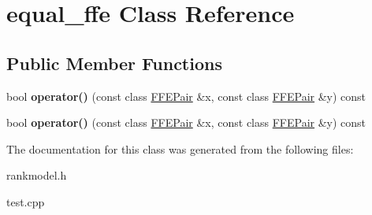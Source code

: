 \hypertarget{classequal__ffe}{\section{equal\-\_\-ffe \-Class \-Reference}
\label{classequal__ffe}
}
\subsection*{\-Public \-Member \-Functions}
\begin{DoxyCompactItemize}
\item 
\hypertarget{classequal__ffe_a6e55584c947cb40c2657bdb3da97ede2}{bool {\bfseries operator()} (const class \hyperlink{classFFEPair}{\-F\-F\-E\-Pair} \&x, const class \hyperlink{classFFEPair}{\-F\-F\-E\-Pair} \&y) const }\label{classequal__ffe_a6e55584c947cb40c2657bdb3da97ede2}

\item 
\hypertarget{classequal__ffe_a6e55584c947cb40c2657bdb3da97ede2}{bool {\bfseries operator()} (const class \hyperlink{classFFEPair}{\-F\-F\-E\-Pair} \&x, const class \hyperlink{classFFEPair}{\-F\-F\-E\-Pair} \&y) const }\label{classequal__ffe_a6e55584c947cb40c2657bdb3da97ede2}

\end{DoxyCompactItemize}


\-The documentation for this class was generated from the following files\-:\begin{DoxyCompactItemize}
\item 
rankmodel.\-h\item 
test.\-cpp\end{DoxyCompactItemize}

